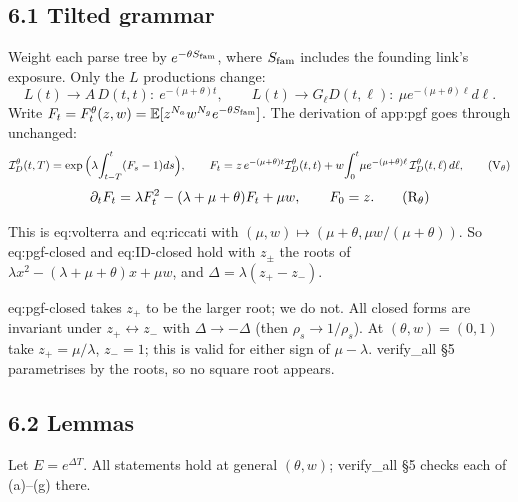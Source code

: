 \documentclass[10pt,]{article}
\begin{document}
\hypertarget{tilted-grammar}{%
\subsection{6.1 Tilted grammar}\label{tilted-grammar}}

Weight each parse tree by \(e^{-\theta S_{\rm fam}}\), where
\(S_{\rm fam}\) includes the founding link's exposure. Only the \(L\)
productions change:
\[L(t)\to A\,D(t,t):\ e^{-(\mu+\theta)t},\qquad L(t)\to G_\ell D(t,\ell):\ \mu e^{-(\mu+\theta)\ell}d\ell .\]
Write
\(F_t=F^{\theta}_t(z,w)=\mathbb E[z^{N_a}w^{N_g}e^{-\theta S_{\rm fam}}]\).
The derivation of app:pgf goes through unchanged:
\[\mathcal I^\theta_D(t,T)=\exp\Big(\lambda\!\int_{t-T}^t(F_s-1)ds\Big),\qquad
F_t=z\,e^{-(\mu+\theta)t}\mathcal I^\theta_D(t,t)+w\!\int_0^t\!\mu e^{-(\mu+\theta)\ell}\,\mathcal I^\theta_D(t,\ell)\,d\ell,\tag{\ensuremath{\mathrm V_\theta}}\]
\[\partial_tF_t=\lambda F_t^2-(\lambda+\mu+\theta)F_t+\mu w,\qquad F_0=z.\tag{\ensuremath{\mathrm R_\theta}}\]

This is eq:volterra and eq:riccati with
\((\mu,w)\mapsto(\mu+\theta,\mu w/(\mu+\theta))\). So eq:pgf-closed and
eq:ID-closed hold with \(z_\pm\) the roots of
\(\lambda x^2-(\lambda+\mu+\theta)x+\mu w\), and
\(\Delta=\lambda(z_+-z_-)\).

eq:pgf-closed takes \(z_+\) to be the larger root; we do not. All closed
forms are invariant under \(z_+\leftrightarrow z_-\) with
\(\Delta\to-\Delta\) (then \(\rho_s\to1/\rho_s\)). At
\((\theta,w)=(0,1)\) take \(z_+=\mu/\lambda\), \(z_-=1\); this is valid
for either sign of \(\mu-\lambda\). verify\_all §5 parametrises by the
roots, so no square root appears.

\hypertarget{lemmas}{%
\subsection{6.2 Lemmas}\label{lemmas}}

Let \(E=e^{\Delta T}\). All statements hold at general \((\theta,w)\);
verify\_all §5 checks each of (a)--(g) there.
\end{document}
